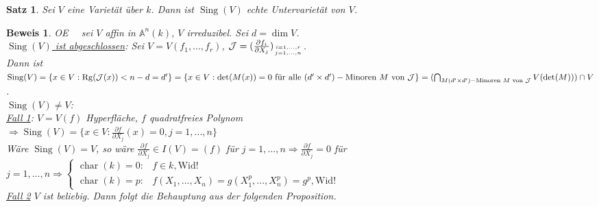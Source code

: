 \documentclass[a4paper,12pt]{report}
\theoremstyle{break}
\newtheorem{Satz}{Satz}
\theoremstyle{nonumberbreak}
\theoremstyle{nonumberplain}
\newtheorem{Bew}{Beweis}
\renewcommand{\OE}{O\!\!E}
\begin{document}
\begin{Satz}
\label{satz:5}
Sei $V$ eine Varietät über $k$. Dann ist $\operatorname{Sing}(V)$ echte Untervarietät von $V$.
\end{Satz}

\begin{Bew}
\OE~~ sei $V$ affin in $\mathbb{A}^n(k)$, $V$ irreduzibel. Sei $d=\dim V$.\\
\underline{$\operatorname{Sing}(V)$ ist abgeschlossen}: Sei $V=V(f_1,...,f_r)$, $\mathcal{J}=(\frac{\partial f_i}{\partial X_j})_{i=1,...,r\atop j=1,...,n}$.\\
Dann ist $\operatorname{Sing}(V)=\{x\in V:\operatorname{Rg}(\mathcal{J}(x))<n-d=d'\}=\\
\{x\in V:\det (M(x))=0 \text{ für alle } (d'\times d')-\text{Minoren } M \text{ von } \mathcal{J}\}=\\
(\bigcap_{M(d'\times d')-\text{Minoren } M \text{ von } \mathcal{J}}V(\det(M)))\cap V$.\\
\underline{$\operatorname{Sing}(V)\neq V$}:\\
\underline{Fall 1}: $V=V(f)$ Hyperfläche, $f$ quadratfreies Polynom\\ $\Rightarrow\operatorname{Sing}(V)=\{x\in V:\frac{\partial f}{\partial X_j}(x)=0, j=1,...,n\}$\\
Wäre $\operatorname{Sing}(V)=V$, so wäre $\frac{\partial f}{\partial X_j}\in I(V)=(f)$ für $j=1,...,n\Rightarrow\frac{\partial f}{\partial X_j}=0$ für $j=1,...,n\Rightarrow
\begin{cases}
\operatorname{char}(k)=0:&f\in k, \text{Wid!}\\
\operatorname{char}(k)=p:&f(X_1,...,X_n)=g(X_1^p,...,X_n^p)=g^p, \text{Wid!}
\end{cases}$\\
\underline{Fall 2} $V$ ist beliebig. Dann folgt die Behauptung aus der folgenden Proposition.
\end{Bew}
\end{document}
